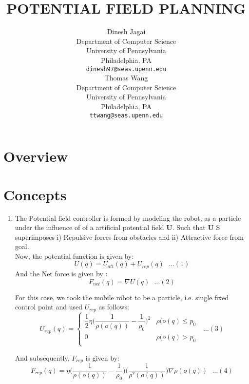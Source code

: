 \documentclass{article}
\title{POTENTIAL FIELD PLANNING}
\author{
  Dinesh Jagai \\
  Department of Computer Science\\
 University of Pennsylvania \\
 Philadelphia, PA \\  
  \texttt{dinesh97@seas.upenn.edu} \\
  \And
  Thomas Wang \\
  Department of Computer Science\\
 University of Pennsylvania \\
 Philadelphia, PA \\  
  \texttt{ttwang@seas.upenn.edu} \\

}
\begin{document}
\maketitle
\section{Overview}
\section{Concepts}
  
  \begin{enumerate}
    \item 
    The Potential field controller is formed by modeling the robot, as a particle under the influence of of a artificial potential field  $\textbf{U} $. Such that $\textbf{U}$ S superimposes i)  Repulsive forces from obstacles and ii) Attractive force from goal. \\ 
    
    Now, the potential function is given by: \\ 
    $$ U(q) = U_{att}(q) + U_{rep}(q)  \  \ \  \ldots (1)$$ 
    And the Net force is given by : \\ 
    $$ F_{net}(q)  = \nabla U(q)  \  \ \  \ldots (2)$$ 
    
    For this case, we took the mobile robot to be a particle, i.e. single fixed control point and used $U_{rep}$ as follows: \\ 
       $$  U_{rep}(q)=  \begin{cases} 
      \dfrac{1}{2}\eta\bigg(\dfrac{1}{\rho(o(q))} - \dfrac{1}{\rho_{0}}\bigg)^2 & \rho(o(q) \leq p_0  \\
      0 & \rho(o(q) > p_0  \\
      \end{cases}  \  \ \  \ldots (3)$$ 
      
     And subsequently, $F_{rep}$ is given by: \\ 
       $$ F_{rep}(q) = \eta\bigg(\dfrac{1}{\rho(o(q))} - \dfrac{1}{\rho_{0}}\bigg)\bigg(\dfrac{1}{\rho^2(o(q))}\bigg)
       \nabla\rho(o(q))  \  \ \  \ldots (4)$$ 
       

\end{enumerate}
\end{document}

